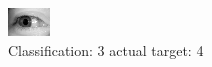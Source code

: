 \begin{figure}[h!]
\begin{center}
\includegraphics[width=0.60\columnwidth]{figures/ID3138_class_3_target_4.png}
\end{center}
\caption{ Classification: 3 actual target: 4}
\label{fig:ID3138_class_3_target_4}
\end{figure}
